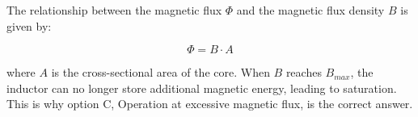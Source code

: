 The relationship between the magnetic flux \( \Phi \) and the magnetic flux density \( B \) is given by:

\[
\Phi = B \cdot A
\]

where \( A \) is the cross-sectional area of the core. When \( B \) reaches \( B_{max} \), the inductor can no longer store additional magnetic energy, leading to saturation. This is why option C, Operation at excessive magnetic flux, is the correct answer.

